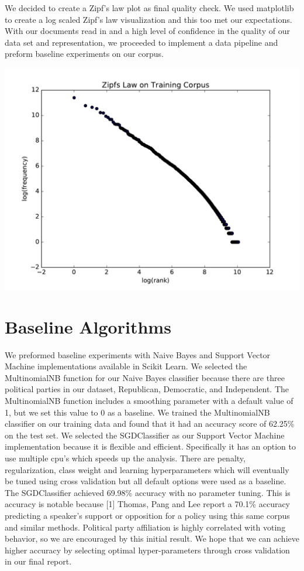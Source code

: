 \documentclass[a4paper, 11pt]{article}
\begin{document}
\noindent
We decided to create a Zipf's law plot as final quality check. We used matplotlib to create a log scaled Zipf's law visualization and this too met our expectations.  With our documents read in and a high level of confidence in the quality of our data set and representation, we proceeded to implement a data pipeline and preform baseline experiments on our corpus.\\
\begin{center}
\includegraphics[scale=.5]{zipfslaw.pdf}
\end{center}
\section{Baseline Algorithms}
\noindent
We preformed baseline experiments with Naive Bayes and Support Vector Machine implementations available in Scikit Learn.  We selected the MultinomialNB function for our Naive Bayes classifier because there are three political parties in our dataset, Republican, Democratic, and Independent. The MultinomialNB function includes a smoothing parameter with a default value of 1, but we set this value to 0 as a baseline.  We trained the MultinomialNB classifier on our training data and found that it had an accuracy score of 62.25\% on the test set. We selected the SGDClassifier as our Support Vector Machine implementation because it is flexible and efficient. Specifically it has an option to use multiple cpu's which speeds up the analysis. There are penalty, regularization, class weight and learning hyperparameters which will eventually be tuned using cross validation but all default options were used as a baseline. The SGDClassifier achieved 69.98\% accuracy with no parameter tuning. This is accuracy is notable because [1] Thomas, Pang and Lee report a 70.1\% accuracy predicting a speaker's support or opposition for a policy using this same corpus and similar methods. Political party affiliation is highly correlated with voting behavior, so we are encouraged by this initial result.  We hope that we can achieve higher accuracy by selecting optimal hyper-parameters through cross validation in our final report.
\end{document}
